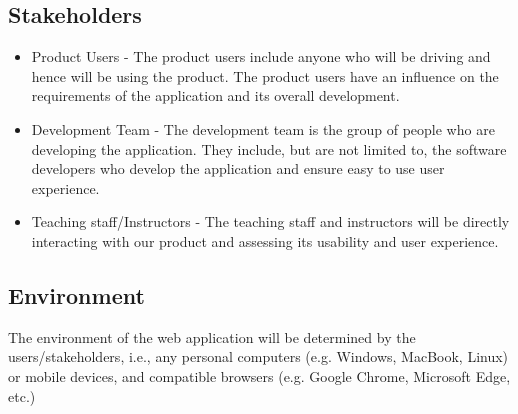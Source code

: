 \documentclass{article}
\begin{document}
\subsection{Stakeholders}
\begin{itemize}
    \item Product Users - The product users include anyone who will be driving and hence will 
    be using the product. The product users have an influence on the requirements of the application 
    and its overall development. 
    \item Development Team - The development team is the group of people who are developing the application. 
    They include, but are not limited to, the software developers who develop the application and ensure easy 
    to use user experience.
    \item Teaching staff/Instructors - The teaching staff and instructors will be directly interacting with 
    our product and assessing its usability and user experience. 
\end{itemize}

\subsection{Environment}
The environment of the web application will be determined by the users/stakeholders, i.e., any personal computers (e.g. Windows, MacBook, Linux) or mobile devices, and compatible browsers (e.g. Google Chrome, Microsoft Edge, etc.) 
\end{document}
